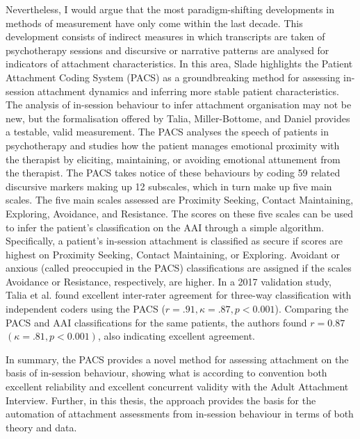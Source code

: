 \documentclass[12pt]{report}
\begin{document}
Nevertheless, I would argue that the most paradigm-shifting developments in methods of measurement have only come within the last decade.
This development consists of indirect measures in which transcripts are taken of psychotherapy sessions and discursive or narrative patterns are analysed for indicators of attachment characteristics.
In this area, Slade \citeyear{Slade2016} highlights the Patient Attachment Coding System (PACS) as a groundbreaking method for assessing in-session attachment dynamics and inferring more stable patient characteristics.
The analysis of in-session behaviour to infer attachment organisation may not be new, but the formalisation offered by Talia, Miller-Bottome, and Daniel \citeyear{Talia2017, Talia2014} provides a testable, valid measurement.
The PACS analyses the speech of patients in psychotherapy and studies how the patient manages emotional proximity with the therapist by eliciting, maintaining, or avoiding emotional attunement from the therapist.
The PACS takes notice of these behaviours by coding 59 related discursive markers making up 12 subscales, which in turn make up five main scales.
The five main scales assessed are Proximity Seeking, Contact Maintaining, Exploring, Avoidance, and Resistance.
The scores on these five scales can be used to infer the patient's classification on the AAI through a simple algorithm.
Specifically, a patient's in-session attachment is classified as secure if scores are highest on Proximity Seeking, Contact Maintaining, or Exploring.
Avoidant or anxious (called preoccupied in the PACS) classifications are assigned if the scales Avoidance or Resistance, respectively, are higher.
In a 2017 validation study, Talia et al. \citeyear{Talia2017} found excellent inter-rater agreement for three-way classification with independent coders using the PACS ($r=.91, \kappa = .87, p<0.001$).
Comparing the PACS and AAI classifications for the same patients, the authors found $r=0.87$ $(\kappa = .81, p<0.001)$, also indicating excellent agreement.

In summary, the PACS provides a novel method for assessing attachment on the basis of in-session behaviour, showing what is according to convention \cite{Cicchetti1994} both excellent reliability and excellent concurrent validity with the Adult Attachment Interview.
Further, in this thesis, the approach provides the basis for the automation of attachment assessments from in-session behaviour in terms of both theory and data.
\end{document}

